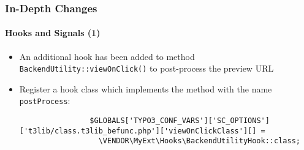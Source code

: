 \begin{frame}[fragile]
	\frametitle{In-Depth Changes}
	\framesubtitle{Hooks and Signals (1)}

	\lstset{basicstyle=\tiny\ttfamily}

	\begin{itemize}

		\item An additional hook has been added to method \texttt{BackendUtility::viewOnClick()}
			to post-process the preview URL

		\item Register a hook class which implements the method with the name \texttt{postProcess}:

			\begin{lstlisting}
				$GLOBALS['TYPO3_CONF_VARS']['SC_OPTIONS']['t3lib/class.t3lib_befunc.php']['viewOnClickClass'][] =
				  \VENDOR\MyExt\Hooks\BackendUtilityHook::class;
			\end{lstlisting}

	\end{itemize}

\end{frame}

